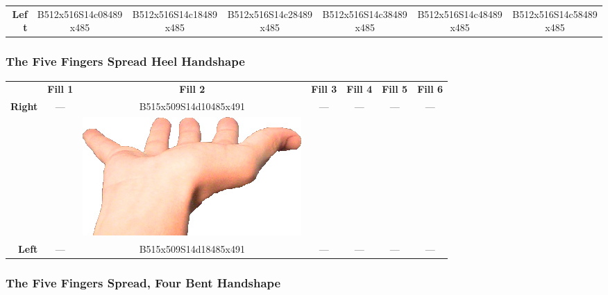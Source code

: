 \documentclass{article}
\begin{document}
\begin{center}
\begin{tabular}{r*{6}{c}}
\textbf{Left}&
B512x516S14c08489x485&
B512x516S14c18489x485&
B512x516S14c28489x485&
B512x516S14c38489x485&
B512x516S14c48489x485&
B512x516S14c58489x485\\
\end{tabular}
\end{center}

\subsubsection{The Five Fingers Spread Heel Handshape}

\begin{center}
\begin{tabular}{r*{6}{c}}
&\textbf{Fill 1}&\textbf{Fill 2}&\textbf{Fill 3}&\textbf{Fill 4}&\textbf{Fill 5}&\textbf{Fill 6}\\
\multirow{2}{*}{\textbf{Right}}&
\multirow{2}{*}{---}&
B515x509S14d10485x491&
\multirow{2}{*}{---}&
\multirow{2}{*}{---}&
\multirow{2}{*}{---}&
\multirow{2}{*}{---}\\
&
&
\includegraphics[scale=0.1]{images/05-02-2.jpg}\\
\textbf{Left}&
---&
B515x509S14d18485x491&
---&
---&
---&
---\\
\end{tabular}
\end{center}

\subsubsection{The Five Fingers Spread, Four Bent Handshape}
\end{document}
